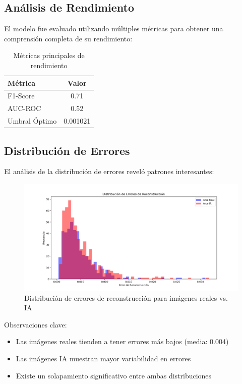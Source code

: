 \documentclass[conference]{IEEEtran}
\begin{document}
\subsection{Análisis de Rendimiento}
El modelo fue evaluado utilizando múltiples métricas para obtener una comprensión completa de su rendimiento:

\begin{table}[h]
\centering
\begin{tabular}{|l|c|}
\hline
\textbf{Métrica} & \textbf{Valor} \\
\hline
F1-Score & 0.71 \\
AUC-ROC & 0.52 \\
Umbral Óptimo & 0.001021 \\
\hline
\end{tabular}
\caption{Métricas principales de rendimiento}
\label{tab:metricas}
\end{table}

\subsection{Distribución de Errores}
El análisis de la distribución de errores reveló patrones interesantes:

\begin{figure}[h]
\centering
\includegraphics[width=0.8\linewidth]{distribucion_errores.png}
\caption{Distribución de errores de reconstrucción para imágenes reales vs. IA}
\label{fig:distribucion}
\end{figure}

Observaciones clave:
\begin{itemize}
    \item Las imágenes reales tienden a tener errores más bajos (media: 0.004)
    \item Las imágenes IA muestran mayor variabilidad en errores
    \item Existe un solapamiento significativo entre ambas distribuciones
\end{itemize}
\end{document}
